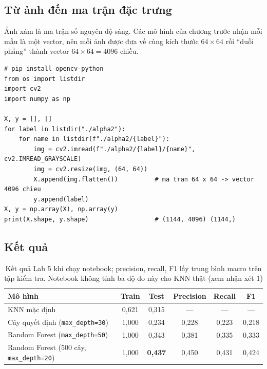 \subsection{Từ ảnh đến ma trận đặc trưng}

Ảnh xám là ma trận số nguyên độ sáng. Các mô hình của chương trước nhận mỗi mẫu là một vector, nên mỗi ảnh được đưa về cùng kích thước $64 \times 64$ rồi ``duỗi phẳng'' thành vector $64 \times 64 = 4096$ chiều.

\begin{lstlisting}[caption={Lab 5 -- đọc ảnh và tạo ma trận đặc trưng}]
# pip install opencv-python
from os import listdir
import cv2
import numpy as np

X, y = [], []
for label in listdir("./alpha2"):
    for name in listdir(f"./alpha2/{label}"):
        img = cv2.imread(f"./alpha2/{label}/{name}", cv2.IMREAD_GRAYSCALE)
        img = cv2.resize(img, (64, 64))
        X.append(img.flatten())          # ma tran 64 x 64 -> vector 4096 chieu
        y.append(label)
X, y = np.array(X), np.array(y)
print(X.shape, y.shape)                  # (1144, 4096) (1144,)
\end{lstlisting}


\subsection{Kết quả}

\begin{table}[H]
\centering
\begin{tabular}{|l|c|c|c|c|c|}
\hline
\textbf{Mô hình} & \textbf{Train} & \textbf{Test} & \textbf{Precision} & \textbf{Recall} & \textbf{F1} \\
\hline
KNN mặc định & 0,621 & 0,315 & --- & --- & --- \\ \hline
Cây quyết định (\texttt{max\_depth=30}) & 1,000 & 0,234 & 0,228 & 0,223 & 0,218 \\ \hline
Random Forest (\texttt{max\_depth=50}) & 1,000 & 0,343 & 0,381 & 0,335 & 0,333 \\ \hline
Random Forest (500 cây, \texttt{max\_depth=20}) & 1,000 & \textbf{0,437} & 0,450 & 0,431 & 0,424 \\ \hline
\end{tabular}
\caption{Kết quả Lab 5 khi chạy notebook; precision, recall, F1 lấy trung bình macro trên tập kiểm tra. Notebook không tính ba độ đo này cho KNN thật (xem nhận xét 1)}
\label{tab:lab-hw}
\end{table}

